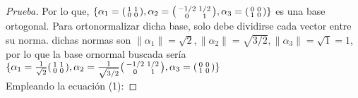 \documentclass[12pt]{article}
\newenvironment{xmat}
  {\left(\begin{smallmatrix}}
  {\end{smallmatrix}\right)}
\begin{document}
\begin{proof}[Prueba]
Por lo que, $\{\alpha_{1}=\begin{xmat}1 & 1\\0 & 0\end{xmat},
			\alpha_{2}=\begin{xmat}-1/2 & 1/2\\0 & 1\end{xmat},
			\alpha_{3}=\begin{xmat}0 & 0\\1 & 0\end{xmat}\}$ es una base ortogonal. Para ortonormalizar dicha base, solo debe dividirse cada vector entre su norma. dichas normas son $\|\alpha_{1}\|=\sqrt{2}, \|\alpha_{2}\|=\sqrt{3/2}, \|\alpha_{3}\|=\sqrt{1}=1$, por lo que la base ornormal buscada sería $\{\alpha_{1}=\frac{1}{\sqrt{2}}\begin{xmat}1 & 1\\0 & 0\end{xmat},
			\alpha_{2}=\frac{1}{\sqrt{3/2}}\begin{xmat}-1/2 & 1/2\\0 & 1\end{xmat},
			\alpha_{3}=\begin{xmat}0 & 0\\1 & 0\end{xmat}\}$\\

Empleando la ecuación (1):
			

\end{proof}
\end{document}

